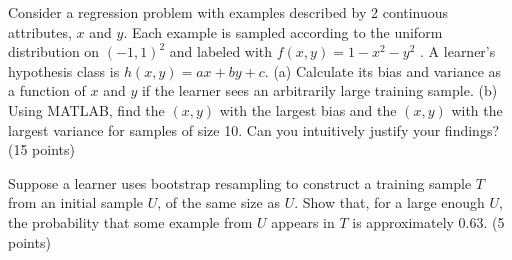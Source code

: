 \documentclass[fleqn]{homework}
\begin{document}
  \begin{problem}{3}
    \begin{question}
      Consider a regression problem with examples described by 2 continuous
      attributes, $x$ and $y$.  Each example is sampled according to the uniform
      distribution on $(-1,1)^2$ and labeled with $f(x,y)=1 - x^2 - y^2$ . A
      learner’s hypothesis class is $h(x,y)=ax+by+c$. (a) Calculate its bias and
      variance as a function of $x$ and $y$ if the learner sees an arbitrarily
      large training sample. (b) Using MATLAB, find the $(x,y)$ with the largest
      bias and the $(x,y)$ with the largest variance for samples of size 10. Can
      you intuitively justify your findings? (15 points)
    \end{question}
  \end{problem}

  \begin{problem}{4}
    \begin{question}
      Suppose a learner uses bootstrap resampling to construct a training sample
      $T$ from an initial sample $U$, of the same size as $U$. Show that, for a
      large enough $U$, the probability that some example from $U$ appears in
      $T$ is approximately 0.63. (5 points)
    \end{question}
  \end{problem}
\end{document}
